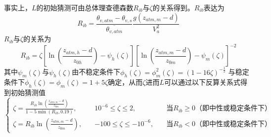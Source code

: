 事实上，$L$的初始猜测可由总体理查德森数$R_{ib}$与$\zeta$的关系得到\citep{arya2001introduction}。$R_{ib}$表达为
\begin{equation}\label{Rib}
R_{i b}=\frac{\theta_{v, atm}-\theta_{v, s}}{\overline{\theta_{v, atm}}} \frac{g\left(z_{atm, m}-d\right)}{V_{a}^{2}}
\end{equation}
$R_{ib}$与$\zeta$的关系为
\begin{equation}
R_{ib}=\zeta[\ln{\left(\frac{z_{atm,h}-d}{z_{0h}}\right)-\psi_h(\zeta)}] [\ln{\left(\frac{z_{atm,m}-d}{z_{0m}}\right)-\psi_m(\zeta)}]^{-2}
\end{equation}
其中$\psi_m(\zeta)$与$\psi_h(\zeta)$由不稳定条件下$\phi_h\left(\zeta\right)=\phi_m^2\left(\zeta\right)=\left(1-16\zeta\right)^{-\frac{1}{2}}$ 
与稳定条件下$\phi_h\left(\zeta\right)=\phi_m\left(\zeta\right)=1+5\zeta$确定，从而$\zeta$进而$L$可以通过以下反算关系式得到初始猜测值
\begin{equation}\label{ZetaRib}
\left\{\begin{array}{lll}\zeta=\frac{R_{i b} \ln \left(\frac{z_{atm, m}-d}{z_{0 m}}\right)}{1-5 \min \left(R_{i b}, 0.19\right)}, \quad & 10^{-6} \leq \zeta \leq 2, \quad & \text{当} R_{i b} \geq 0 \text{（即中性或稳定条件下）} \\
      \zeta=R_{i b} \ln \left(\frac{z_{atm, m}-d}{z_{0 m}}\right), \quad & -100 \leq \zeta \leq-10^{-6}, \quad & \text{当} R_{i b}<0 \text{（即中性或稳定条件下）}\end{array}\right.
\end{equation}


